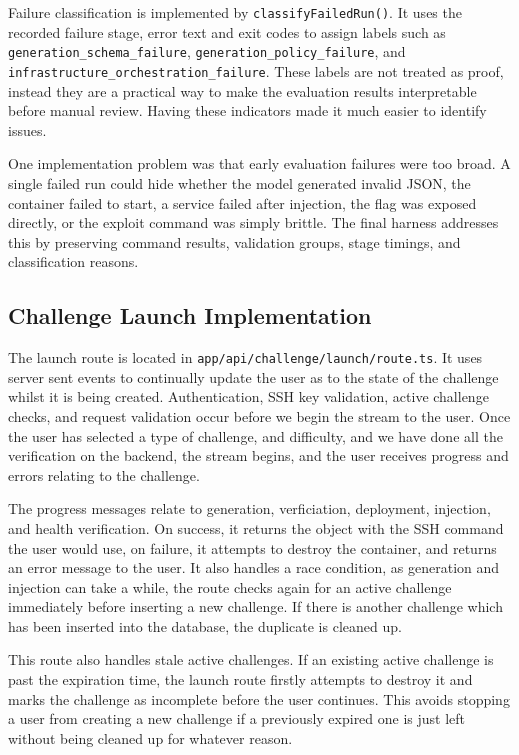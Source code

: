 Failure classification is implemented by \lstinline{classifyFailedRun()}. It uses the recorded failure stage, error text and exit codes to assign labels such as \lstinline{generation_schema_failure}, \lstinline{generation_policy_failure}, and \lstinline{infrastructure_orchestration_failure}. These labels are not treated as proof, instead they are a practical way to make the evaluation results interpretable before manual review. Having these indicators made it much easier to identify issues.

One implementation problem was that early evaluation failures were too broad. A single failed run could hide whether the model generated invalid JSON, the container failed to start, a service failed after injection, the flag was exposed directly, or the exploit command was simply brittle. The final harness addresses this by preserving command results, validation groups, stage timings, and classification reasons.

\subsection{Challenge Launch Implementation}\label{sec:challenge-launch_implementation}

The launch route is located in \lstinline{app/api/challenge/launch/route.ts}. It uses server sent events to continually update the user as to the state of the challenge whilst it is being created. Authentication, SSH key validation, active challenge checks, and request validation occur before we begin the stream to the user. Once the user has selected a type of challenge, and difficulty, and we have done all the verification on the backend, the stream begins, and the user receives progress and errors relating to the challenge.

The progress messages relate to generation, verficiation, deployment, injection, and health verification. On success, it returns the object with the SSH command the user would use, on failure, it attempts to destroy the container, and returns an error message to the user. It also handles a race condition, as generation and injection can take a while, the route checks again for an active challenge immediately before inserting a new challenge. If there is another challenge which has been inserted into the database, the duplicate is cleaned up.

This route also handles stale active challenges. If an existing active challenge is past the expiration time, the launch route firstly attempts to destroy it and marks the challenge as incomplete before the user continues. This avoids stopping a user from creating a new challenge if a previously expired one is just left without being cleaned up for whatever reason.

